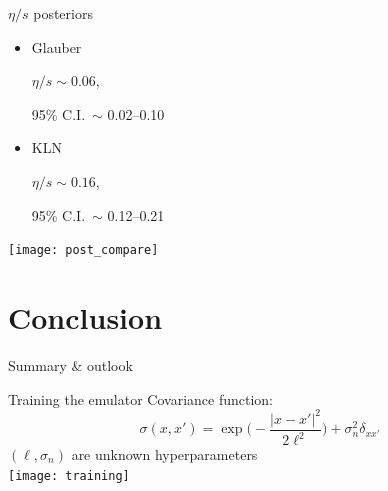 \documentclass{beamer}
\begin{document}
\begin{frame}{$\eta/s$ posteriors}
  \begin{itemize}
    \item
      \parbox{3.5em}{Glauber}
      \parbox{5em}{$\eta/s \sim 0.06$,}
      95\% C.I.\ $\sim$ 0.02--0.10
    \item
      \parbox{3.5em}{KLN}
      \parbox{5em}{$\eta/s \sim 0.16$,}
      95\% C.I.\ $\sim$ 0.12--0.21
  \end{itemize}
  \medskip
  \centering
  \texttt{[image: post\_compare]}
\end{frame}


\section{Conclusion}

\begin{frame}{Summary \& outlook}

\end{frame}


\appendix


\begin{frame}{Training the emulator}
  Covariance function:
  \begin{equation*}
    \sigma(x, x') = \exp\biggl( -\frac{|x - x'|^2}{2\ell^2} \biggr) +
                    \sigma_n^2\delta_{xx'}
  \end{equation*}
  $(\ell, \sigma_n)$ are unknown hyperparameters \\
  \bigskip
  \centering
  \texttt{[image: training]}
\end{frame}
\end{document}
